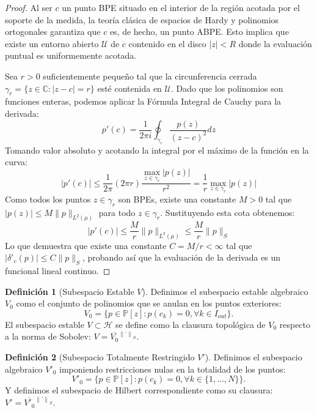 \documentclass[12pt,a4paper]{article}
\theoremstyle{definition}
\newtheorem{definicion}{Definición}
\theoremstyle{remark}
\newcommand{\Poly}{\mathbb{P}[z]}
\newcommand{\norm}[1]{\left\| #1 \right\|_S}
\begin{document}
\begin{proof}
    Al ser $c$ un punto BPE situado en el interior de la región acotada por el soporte de la medida, la teoría clásica de espacios de Hardy y polinomios ortogonales garantiza que $c$ es, de hecho, un punto ABPE. Esto implica que existe un entorno abierto $\mathcal{U}$ de $c$ contenido en el disco $|z| < R$ donde la evaluación puntual es uniformemente acotada.

    Sea $r > 0$ suficientemente pequeño tal que la circunferencia cerrada $\gamma_r = \{z \in \mathbb{C} : |z-c| = r\}$ esté contenida en $\mathcal{U}$. Dado que los polinomios son funciones enteras, podemos aplicar la Fórmula Integral de Cauchy para la derivada:
    \[
        p'(c) = \frac{1}{2\pi i} \oint_{\gamma_r} \frac{p(z)}{(z-c)^2} dz
    \]
    Tomando valor absoluto y acotando la integral por el máximo de la función en la curva:
    \[
        |p'(c)| \le \frac{1}{2\pi} \left( 2\pi r \right) \frac{\max_{z \in \gamma_r} |p(z)|}{r^2} = \frac{1}{r} \max_{z \in \gamma_r} |p(z)|
    \]
    Como todos los puntos $z \in \gamma_r$ son BPEs, existe una constante $M > 0$ tal que $|p(z)| \le M \|p\|_{L^2(\mu)}$ para todo $z \in \gamma_r$. Sustituyendo esta cota obtenemos:
    \[
        |p'(c)| \le \frac{M}{r} \|p\|_{L^2(\mu)} \le \frac{M}{r} \|p\|_S
    \]
    Lo que demuestra que existe una constante $C = M/r < \infty$ tal que $|\delta'_c(p)| \le C \|p\|_S$, probando así que la evaluación de la derivada es un funcional lineal continuo.
\end{proof}

\begin{definicion}[Subespacio Estable $V$]
    Definimos el subespacio estable algebraico $V_0$ como el conjunto de polinomios que se anulan en los puntos exteriores:
    \begin{equation}
        V_0 = \{p \in \Poly : p(c_k) = 0, \forall k \in I_{out}\}.
    \end{equation}
    El subespacio estable $V \subset \mathcal{H}$ se define como la clausura topológica de $V_0$ respecto a la norma de Sobolev: $V = \overline{V_0}^{\norm{\cdot}}$.
\end{definicion}

\begin{definicion}[Subespacio Totalmente Restringido $V'$]
    Definimos el subespacio algebraico $V'_0$ imponiendo restricciones nulas en la totalidad de los puntos:
    \begin{equation}
        V'_0 = \{p \in \Poly : p(c_k) = 0, \forall k \in \{1, \dots, N\}\}.
    \end{equation}
    Y definimos el subespacio de Hilbert correspondiente como su clausura: $V' = \overline{V'_0}^{\norm{\cdot}}$.
\end{definicion}
\end{document}
